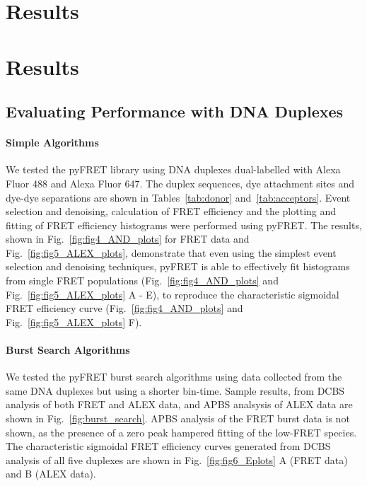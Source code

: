 

\section{Results}
\section*{Results}

\subsection*{Evaluating Performance with DNA Duplexes}
\paragraph{Simple Algorithms}
We tested the pyFRET library using DNA duplexes dual-labelled with Alexa Fluor 488 and Alexa Fluor 647. The duplex sequences, dye attachment sites and dye-dye separations are shown in Tables~\ref{tab:donor} and~\ref{tab:acceptors}. Event selection and denoising, calculation of FRET efficiency and the plotting and fitting of FRET efficiency histograms were performed using pyFRET. The results, shown in Fig.~\ref{fig:fig4_AND_plots} for FRET data and Fig.~\ref{fig:fig5_ALEX_plots}, demonstrate that even using the simplest event selection and denoising techniques, pyFRET is able to effectively fit histograms from single FRET populations (Fig.~\ref{fig:fig4_AND_plots} and Fig.~\ref{fig:fig5_ALEX_plots} A - E), to reproduce the characteristic sigmoidal FRET efficiency curve (Fig.~\ref{fig:fig4_AND_plots} and Fig.~\ref{fig:fig5_ALEX_plots} F).

\paragraph{Burst Search Algorithms}
We tested the pyFRET burst search algorithms using data collected from the same DNA duplexes but using a shorter bin-time. Sample results, from DCBS analysis of both FRET and ALEX data, and APBS analsysis of ALEX data are shown in Fig.~\ref{fig:burst_search}. APBS analysis of the FRET burst data is not shown, as the presence of a zero peak hampered fitting of the low-FRET species. The characteristic sigmoidal FRET efficiency curves generated from DCBS analysis of all five duplexes are shown in Fig.~\ref{fig:fig6_Eplots} A (FRET data) and B (ALEX data).

